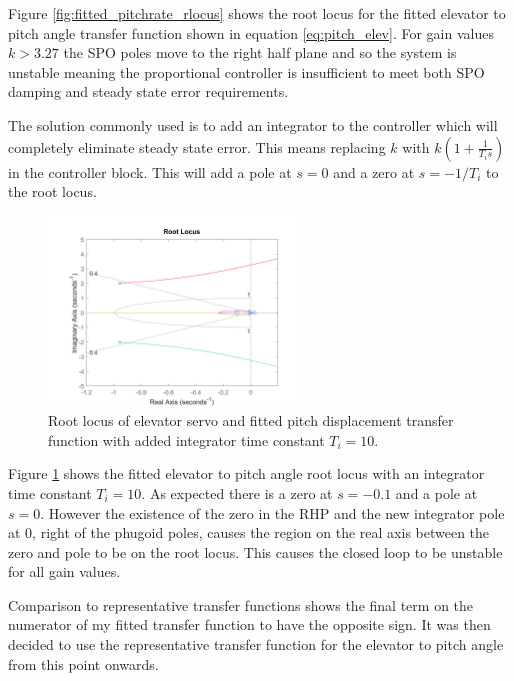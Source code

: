 \documentclass{article}
\begin{document}
Figure \ref{fig:fitted_pitchrate_rlocus} shows the root locus for the fitted elevator to pitch angle transfer function shown in equation \ref{eq:pitch_elev}.
For gain values $k>3.27$ the SPO poles move to the right half plane and so the system is unstable meaning the proportional controller is insufficient to meet both SPO damping and steady state error requirements.

The solution commonly used is to add an integrator to the controller which will completely eliminate steady state error.
This means replacing $k$ with $k(1 + \frac{1}{T_i s})$ in the controller block.
This will add a pole at $s=0$ and a zero at $s=-1/T_i$ to the root locus.

\begin{figure}[H]
    \centering
    \includegraphics[width=0.6\textwidth]{figures/pitch_autopilot_locus_intbad.png}
    \caption{Root locus of elevator servo and fitted pitch displacement transfer function with added integrator time constant $T_i = 10$.}
    \label{fig:fitted_pitchrate_rlocus_int}
\end{figure}

Figure \ref{fig:fitted_pitchrate_rlocus_int} shows the fitted elevator to pitch angle root locus with an integrator time constant $T_i = 10$.
As expected there is a zero at $s=-0.1$ and a pole at $s=0$.
However the existence of the zero in the RHP and the new integrator pole at 0, right of the phugoid poles, causes the region on the real axis between the zero and pole to be on the root locus.
This causes the closed loop to be unstable for all gain values.

Comparison to representative transfer functions \cite{rep} shows the final term on the numerator of my fitted transfer function to have the opposite sign.
It was then decided to use the representative transfer function for the elevator to pitch angle from this point onwards.
\end{document}
